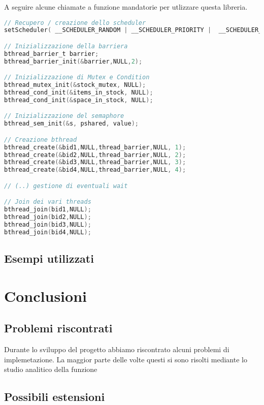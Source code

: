 \documentclass{article}
\begin{document}
A seguire alcune chiamate a funzione mandatorie per utlizzare questa libreria.

\begin{lstlisting}[language=C]
// Recupero / creazione dello scheduler
setScheduler( __SCHEDULER_RANDOM | __SCHEDULER_PRIORITY |  __SCHEDULER_ROUNDROBIN);

// Inizializzazione della barriera
bthread_barrier_t barrier;
bthread_barrier_init(&barrier,NULL,2);

// Inizializzazione di Mutex e Condition
bthread_mutex_init(&stock_mutex, NULL);
bthread_cond_init(&items_in_stock, NULL);
bthread_cond_init(&space_in_stock, NULL);

// Inizializzazione del semaphore
bthread_sem_init(&s, pshared, value);

// Creazione bthread
bthread_create(&bid1,NULL,thread_barrier,NULL, 1);
bthread_create(&bid2,NULL,thread_barrier,NULL, 2);
bthread_create(&bid3,NULL,thread_barrier,NULL, 3);
bthread_create(&bid4,NULL,thread_barrier,NULL, 4);

// (..) gestione di eventuali wait

// Join dei vari threads
bthread_join(bid1,NULL);
bthread_join(bid2,NULL);
bthread_join(bid3,NULL);
bthread_join(bid4,NULL);

\end{lstlisting}

\subsection{Esempi utilizzati}
\vspace{2mm}



\section{Conclusioni}
\vspace{5mm}
\subsection{Problemi riscontrati}
\vspace{2mm}

Durante lo sviluppo del progetto abbiamo riscontrato alcuni problemi di implemetazione. La maggior parte delle volte questi si sono risolti mediante lo studio analitico della funzione 
\subsection{Possibili estensioni}
\vspace{2mm}
\end{document}

